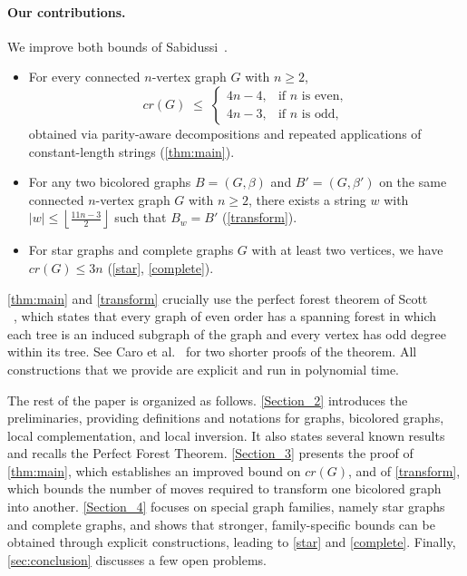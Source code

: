 \documentclass[runningheads,orivec]{llncs}
\begin{document}
\paragraph{Our contributions.}
We improve both bounds of Sabidussi~\cite{sabidussi1987color}.
\begin{itemize}
  \item For every connected $n$-vertex graph $G$ with $n \geq 2$,
  \[
    cr(G)\;\le\;
    \begin{cases}
      4n-4, & \text{if $n$ is even},\\
      4n-3, & \text{if $n$ is odd},
    \end{cases}
  \]
  obtained via parity-aware decompositions and repeated applications of \\constant-length strings (\autoref{thm:main}).
  \item For any two bicolored graphs $B=(G,\beta)$ and $B'=(G,\beta')$ on the same connected $n$-vertex graph $G$ with $n\geq 2$, there exists a string $w$ with
  $|w|\le \left \lfloor \tfrac{11n-3}{2} \right \rfloor$ such that $B_w = B'$ (\autoref{transform}).
  \item For star graphs and complete graphs $G$ with at least two vertices, we have $cr(G)\leq 3n$ (\autoref{star}, \autoref{complete}).
\end{itemize}

\autoref{thm:main} and \autoref{transform} crucially use the perfect forest theorem of Scott \\ ~\cite{scott2001induced}, which states that every graph of even order has a spanning forest in which each tree is an induced subgraph of the graph and every vertex has odd degree within its tree. See Caro et al.~\cite{caro2017two} for two shorter proofs of the theorem.  
All constructions that we provide are explicit and run in polynomial time.


The rest of the paper is organized as follows. \autoref{Section_2} introduces the preliminaries, providing definitions and notations for graphs, bicolored graphs, local complementation, and local inversion. It also states several known results and recalls the Perfect Forest Theorem. \autoref{Section_3} presents the proof of \autoref{thm:main}, which establishes an improved bound on $cr(G)$, and of \autoref{transform}, which bounds the number of moves required to transform one bicolored graph into another. \autoref{Section_4} focuses on special graph families, namely star graphs and complete graphs, and shows that stronger, family-specific bounds can be obtained through explicit constructions, leading to \autoref{star} and \autoref{complete}. Finally, \autoref{sec:conclusion} discusses a few open problems.
\end{document}
